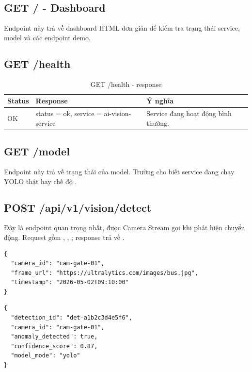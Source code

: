 \subsection{GET / - Dashboard}

Endpoint này trả về dashboard HTML đơn giản để kiểm tra trạng thái service, model và các endpoint demo.

\subsection{GET /health}

\begin{table}[H]
\centering
\caption{GET /health - response}
\label{tab:health}
\ReportTableFont
\begin{tabular}{|>{\raggedright\arraybackslash}p{2.1cm}|>{\raggedright\arraybackslash}p{5.0cm}|>{\raggedright\arraybackslash}p{6.0cm}|}
\hline
\textbf{Status} & \textbf{Response} & \textbf{Ý nghĩa} \\
\hline
200 OK & status = ok, service = ai-vision-service & Service đang hoạt động bình thường. \\
\hline
\end{tabular}
\normalsize
{}
\end{table}

\subsection{GET /model}

Endpoint này trả về trạng thái của model. Trường  cho biết service đang chạy YOLO thật hay chế độ .

\subsection{POST /api/v1/vision/detect}

Đây là endpoint quan trọng nhất, được Camera Stream gọi khi phát hiện chuyển động. Request gồm , , ; response trả về .

\begin{verbatim}
{
  "camera_id": "cam-gate-01",
  "frame_url": "https://ultralytics.com/images/bus.jpg",
  "timestamp": "2026-05-02T09:10:00"
}
\end{verbatim}

\begin{verbatim}
{
  "detection_id": "det-a1b2c3d4e5f6",
  "camera_id": "cam-gate-01",
  "anomaly_detected": true,
  "confidence_score": 0.87,
  "model_mode": "yolo"
}
\end{verbatim}

